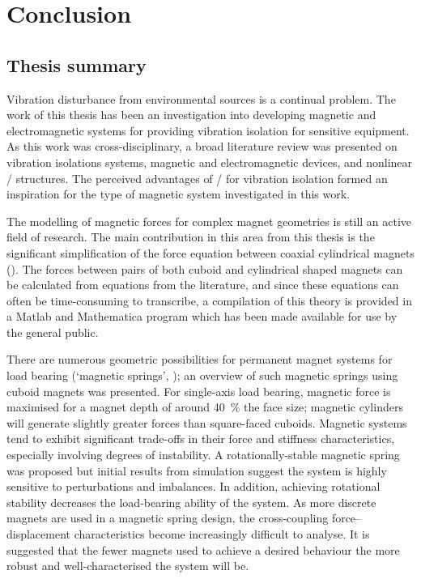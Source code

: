 \documentclass[10pt,a4paper]{memoir}
\begin{document}
\chapter{Conclusion}


\section{Thesis summary}

Vibration disturbance from environmental sources is a continual problem.
The work of this thesis has been an investigation into developing magnetic and electromagnetic systems for providing vibration isolation for sensitive equipment.
As this work was cross-disciplinary, a broad literature review was presented on vibration isolations systems, magnetic and electromagnetic devices, and nonlinear \qzs/ structures.
The perceived advantages of \qzs/ for vibration isolation formed an inspiration for the type of magnetic system investigated in this work.

The modelling of magnetic forces for complex magnet geometries is still an active field of research.
The main contribution in this area from this thesis is the significant simplification of the force equation between coaxial cylindrical magnets ().
The forces between pairs of both cuboid and cylindrical shaped magnets can be calculated from equations from the literature, and since these equations can often be time-consuming to transcribe, a compilation of this theory is provided in a Matlab and Mathematica program which has been made available for use by the general public.

There are numerous geometric possibilities for permanent magnet systems for load bearing (`magnetic springs', ); an overview of such magnetic springs using cuboid magnets was presented.
For single-axis load bearing, magnetic force is maximised for a magnet depth of around \SI{40}{\%} the face size; magnetic cylinders will generate slightly greater forces than square-faced cuboids.
Magnetic systems tend to exhibit significant trade-offs in their force and stiffness characteristics, especially involving degrees of instability.
A rotationally-stable magnetic spring was proposed but initial results from simulation suggest the system is highly sensitive to perturbations and imbalances.
In addition, achieving rotational stability decreases the load-bearing ability of the system.
As more discrete magnets are used in a magnetic spring design, the cross-coupling force--displacement characteristics become increasingly difficult to analyse.
It is suggested that the fewer magnets used to achieve a desired behaviour the more robust and well-characterised the system will be.
\end{document}

